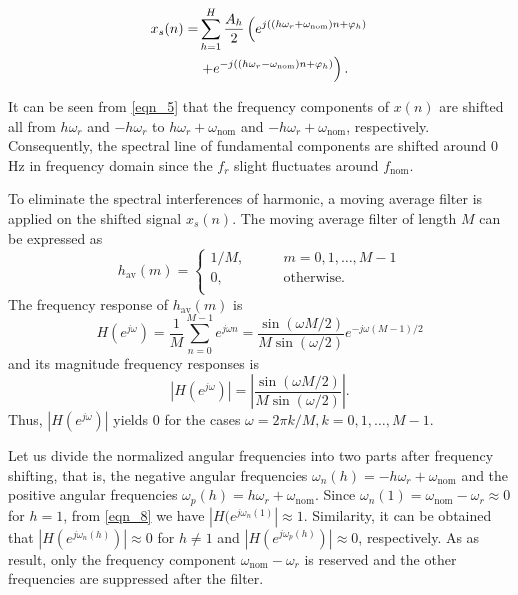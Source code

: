 \documentclass[journal,twoside]{IEEEtran}
\begin{document}
\begin{align}%
x_s(n)=&\sum_{h=1}^{H}\dfrac{A_h}{2}\left(e^{j\left((h\omega_r+\omega_\mathrm{nom})n+\varphi_h\right)}\right.\notag\\
&\left.+e^{-j\left((h\omega_r -\omega_\mathrm{nom})n+\varphi_h\right)}\right).\label{eqn_5}
\end{align}


It can be seen from  \eqref{eqn_5} that the frequency components of $x(n)$ are shifted all from $h\omega_r$ and $-h\omega_r$ to $h\omega_r+\omega_\mathrm{nom}$ and $-h\omega_r+\omega_\mathrm{nom}$, respectively. Consequently, the spectral line of fundamental components are shifted around 0 Hz in frequency domain since the $f_r$ slight fluctuates around $f_\mathrm{nom}$.

To eliminate the spectral interferences of harmonic, a moving average filter is applied on the shifted signal $x_s(n)$. The  moving average filter of length $M$ can be expressed as 
\begin{equation}
h_\mathrm{av}(m)=\begin{cases}
1/M,\qquad &m=0,1,\ldots,M-1\\
0, &\text{otherwise.}\\
\end{cases}\label{eqn_6}
\end{equation}
The frequency response of $h_\mathrm{av}(m)$ is
\begin{equation}
H(e^{j\omega})=\dfrac{1}{M}\sum_{n=0}^{M-1}e^{j\omega n}=\dfrac{\sin(\omega M/2)}{M\sin(\omega/2)}e^{-j\omega (M-1)/2}\label{eqn_7}
\end{equation}
and its magnitude frequency responses is
\begin{equation}
|H(e^{j\omega })|=\left|\dfrac{\sin(\omega M/2)}{M\sin(\omega/2)}\right|\mathrm{.}\label{eqn_8}
\end{equation}
Thus, $|H(e^{j\omega })|$ yields $0$ for the cases $\omega=2\pi k/M,k=0,1,\ldots,M-1$.

Let us divide the normalized angular frequencies into two parts after frequency shifting, that is, the negative angular frequencies $\omega_n(h)=-h\omega_r+\omega_\mathrm{nom}$ and the positive angular frequencies $\omega_p(h)=h\omega_r+\omega_\mathrm{nom}$. Since $\omega_n(1)=\omega_\mathrm{nom}-\omega_r\approx0$ for $h=1$, from \eqref{eqn_8} we have $|H(e^{j\omega_n(1)}|\approx1$. Similarity, it can be obtained that $|H(e^{j\omega_n(h)})|\approx0$ for $h\neq1$ and $|H(e^{j\omega_p(h)})|\approx0$, respectively. As as result, only the frequency component $\omega_\mathrm{nom}-\omega_r$ is reserved and the other frequencies are suppressed after the  filter.
\end{document}
